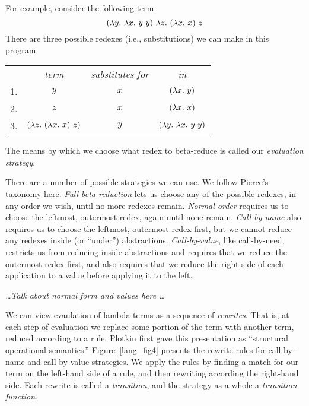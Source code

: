 \documentclass[12pt]{report}
\begin{document}
For example, consider the following term:
\begin{equation}
  \lamAppP{\lamAbs{y}{\lamApp{\lamAbs{x}{y}}{y}}} %
         {\lamAbs{z}{\lamAppP{\lamAbs{x}{x}}{z}}}
\end{equation}
There are three possible redexes (i.e., substitutions) we can make in 
this program:
\begin{center}
  \begin{tabular}{lccc}
    & \emph{term} & \emph{substitutes for} & \emph{in} \\
    \cmidrule(r){2-2} \cmidrule(r){3-3} \cmidrule(r){4-4}
    1. & $y$ & $x$ & $(\lambda x.\ y)$ \\
    2. & $z$ & $x$ & $(\lambda x.\ x)$ \\
    3. & $(\lambda z.\ (\lambda x.\ x)\ z)$ & $y$ & $(\lambda y.\ \lambda x.\ y\ y)$
  \end{tabular}
\end{center}
The means by which we choose what redex to beta-reduce is called our
\emph{evaluation strategy}.

There are a number of possible strategies we can use. We follow
Pierce's taxonomy \citep{PierceXX} here. \emph{Full beta-reduction}
lets us choose any of the possible redexes, in any order we wish,
until no more redexes remain. \emph{Normal-order} requires us to
choose the leftmost, outermost redex, again until none
remain. \emph{Call-by-name} also requires us to choose the leftmost,
outermost redex first, but we cannot reduce any redexes inside (or
``under'') abstractions. \emph{Call-by-value}, like call-by-need,
restricts us from reducing inside abstractions and requires that we
reduce the outermost redex first, and also requires that we reduce the
right side of each application to a value before applying it to the
left.

\emph{\ldots Talk about normal form and values here \ldots}

We can view evaulation of lambda-terms as a sequence of
\emph{rewrites}. That is, at each step of evaluation we replace some
portion of the term with another term, reduced according to a
rule. Plotkin \citep{PlotkinXX} first gave this presentation as
``structural operational semantics.'' Figure~\ref{lang_fig4} presents
the rewrite rules for call-by-name and call-by-value strategies. We
apply the rules by finding a match for our term on the left-hand side
of a rule, and then rewriting according the right-hand side. Each
rewrite is called a \emph{transition}, and the strategy as a whole a
\emph{transition function}.
\end{document}
